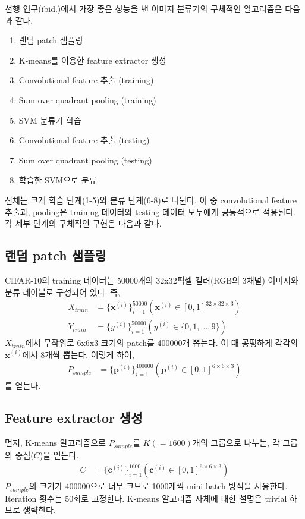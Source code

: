 \documentclass[a4paper,9pt,hidelinks]{article}
\begin{document}
\begin{multicols*}{2}
선행 연구(ibid.)에서 가장 좋은 성능을 낸 이미지 분류기의 구체적인 알고리즘은 다음과 같다.
\begin{enumerate}
\item 랜덤 patch 샘플링
\item K-means를 이용한 feature extractor 생성
\item Convolutional feature 추출 (training)
\item Sum over quadrant pooling (training)
\item SVM 분류기 학습
\item Convolutional feature 추출 (testing)
\item Sum over quadrant pooling (testing)
\item 학습한 SVM으로 분류
\end{enumerate}
전체는 크게 학습 단계(1-5)와 분류 단계(6-8)로 나뉜다.
이 중 convolutional feature 추출과, pooling은 training 데이터와 testing 데이터 모두에게 공통적으로 적용된다.
각 세부 단계의 구체적인 구현은 다음과 같다.

\subsection{랜덤 patch 샘플링}

CIFAR-10의 training 데이터는 50000개의 32x32픽셀 컬러(RGB의 3채널) 이미지와 분류 레이블로 구성되어 있다.
즉,
\begin{align*}
    X_{train} &= \{ \mathbf{x}^{(i)} \}_{i=1}^{50000} ( \mathbf{x}^{(i)} \in [0, 1]^{32 \times 32 \times 3} ) \\
    Y_{train} &= \{ y^{(i)} \}_{i=1}^{50000} ( y^{(i)} \in \{0, 1, ..., 9\} )
\end{align*}
$X_{train}$에서 무작위로 6x6x3 크기의 patch를 400000개 뽑는다.
이 때 공평하게 각각의 $\mathbf{x}^{(i)}$에서 8개씩 뽑는다.
이렇게 하여,
\begin{align*}
    P_{sample} &= \{ \mathbf{p}^{(i)} \}_{i=1}^{400000} ( \mathbf{p}^{(i)} \in [0, 1]^{6 \times 6 \times 3} )
\end{align*}
를 얻는다.

\subsection{Feature extractor 생성}
\label{sec:feature_extractor}

먼저, K-means 알고리즘으로 $P_{sample}$를 $K(=1600)$개의 그룹으로 나누는, 각 그룹의 중심($C$)을 얻는다.
\begin{align*}
    C &= \{ \mathbf{c}^{(i)} \}_{i=1}^{1600} ( \mathbf{c}^{(i)} \in [0, 1]^{6 \times 6 \times 3} )
\end{align*}
$P_{sample}$의 크기가 400000으로 너무 크므로 1000개씩 mini-batch 방식을 사용한다.
Iteration 횟수는 50회로 고정한다.
K-means 알고리즘 자체에 대한 설명은 trivial 하므로 생략한다.


\end{multicols*}
\end{document}
